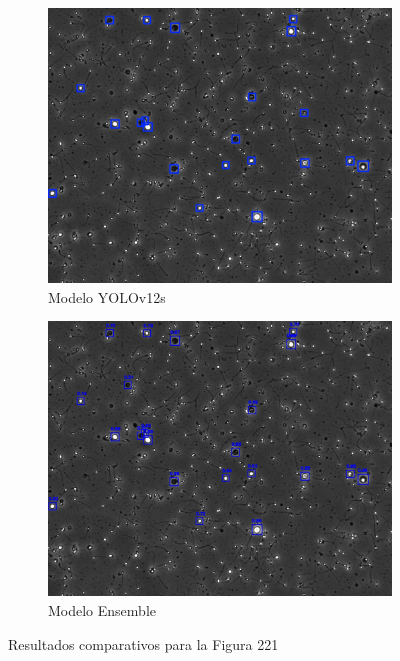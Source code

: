 \documentclass[12pt,a4paper,onecolumn,oneside]{report}
\begin{document}
\begin{figure}[H]
  \vspace{0.3cm} 
  
  \begin{subfigure}[b]{0.48\textwidth}
    \centering
    \includegraphics[width=\textwidth]{figuras/evaluacion_cualitativa/221/221_v12.jpg}
    \caption{Modelo YOLOv12s}
    \label{fig:yolov12s_image_221}
  \end{subfigure}
  \hfill
  \begin{subfigure}[b]{0.48\textwidth}
    \centering
    \includegraphics[width=\textwidth]{figuras/evaluacion_cualitativa/221/221_ensemble.jpg}
    \caption{Modelo Ensemble}
    \label{fig:ensemble_image_221}
  \end{subfigure}
  
  \caption{Resultados comparativos para la Figura 221}
  \label{fig:221}
\end{figure}
\end{document}
